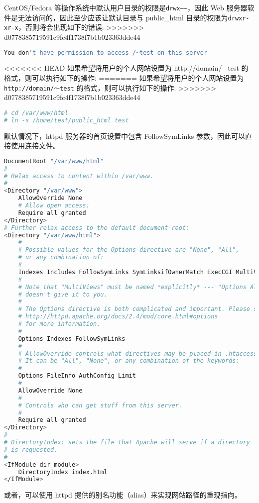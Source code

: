 CentOS/Fedora 等操作系统中默认用户目录的权限是\texttt{drwx------}，因此 Web 服务器软件是无法访问的，因此至少应该让默认目录与 public\_html 目录的权限为\texttt{drwxr-xr-x}，否则将会出现如下的错误:
>>>>>>> d0778385719591c9fc4f1738f7b1b023363dde44

\begin{lstlisting}[language=bash]
You don't have permission to access /~test on this server
\end{lstlisting}


<<<<<<< HEAD
如果希望将用户的个人网站设置为 http://domain/~ test 的格式，则可以执行如下的操作:
=======
如果希望将用户的个人网站设置为 \texttt{http://domain/～test} 的格式，则可以执行如下的操作:
>>>>>>> d0778385719591c9fc4f1738f7b1b023363dde44

\begin{lstlisting}[language=bash]
# cd /var/www/html
# ln -s /home/test/public_html test
\end{lstlisting}


默认情况下，httpd 服务器的首页设置中包含 FollowSymLinks 参数，因此可以直接使用连接文件。


\begin{lstlisting}[language=bash]
DocumentRoot "/var/www/html"
#
# Relax access to content within /var/www.
#
<Directory "/var/www">
	AllowOverride None
	# Allow open access:
	Require all granted
</Directory>
# Further relax access to the default document root:
<Directory "/var/www/html">
	#
	# Possible values for the Options directive are "None", "All",
	# or any combination of:
	#
	Indexes Includes FollowSymLinks SymLinksifOwnerMatch ExecCGI MultiViews
	#
	# Note that "MultiViews" must be named *explicitly* --- "Options All"
	# doesn't give it to you.
	#
	# The Options directive is both complicated and important. Please see
	# http://httpd.apache.org/docs/2.4/mod/core.html#options
	# for more information.
	#
	Options Indexes FollowSymLinks
	#
	# AllowOverride controls what directives may be placed in .htaccess files.
	# It can be "All", "None", or any combination of the keywords:
	#
	Options FileInfo AuthConfig Limit
	#
	AllowOverride None
	#
	# Controls who can get stuff from this server.
	#
	Require all granted
</Directory>
#
# DirectoryIndex: sets the file that Apache will serve if a directory
# is requested.
#
<IfModule dir_module>
	DirectoryIndex index.html
</IfModule>
\end{lstlisting}

或者，可以使用 httpd 提供的别名功能（alias）来实现网站路径的重现指向。

